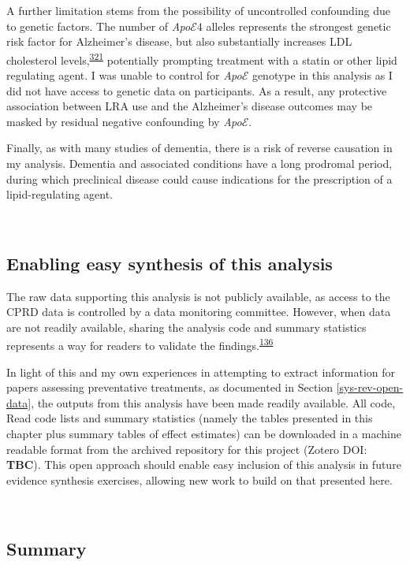 \documentclass[a4paper, twoside]{templates/ociamthesis}
\begin{document}
A further limitation stems from the possibility of uncontrolled confounding due to genetic factors. The number of \emph{Apo}\(\mathcal{E}4\) alleles represents the strongest genetic risk factor for Alzheimer's disease, but also substantially increases LDL cholesterol levels,\textsuperscript{\protect\hyperlink{ref-bennet2007}{321}} potentially prompting treatment with a statin or other lipid regulating agent. I was unable to control for \emph{Apo}\(\mathcal{E}\) genotype in this analysis as I did not have access to genetic data on participants. As a result, any protective association between LRA use and the Alzheimer's disease outcomes may be masked by residual negative confounding by \emph{Apo}\(\mathcal{E}\).

Finally, as with many studies of dementia, there is a risk of reverse causation in my analysis. Dementia and associated conditions have a long prodromal period, during which preclinical disease could cause indications for the prescription of a lipid-regulating agent.

~

\hypertarget{cprd-data-avail}{%
\subsection{Enabling easy synthesis of this analysis}\label{cprd-data-avail}}

The raw data supporting this analysis is not publicly available, as access to the CPRD data is controlled by a data monitoring committee. However, when data are not readily available, sharing the analysis code and summary statistics represents a way for readers to validate the findings.\textsuperscript{\protect\hyperlink{ref-goldacre2019}{136}}

In light of this and my own experiences in attempting to extract information for papers assessing preventative treatments, as documented in Section \ref{sys-rev-open-data}, the outputs from this analysis have been made readily available. All code, Read code lists and summary statistics (namely the tables presented in this chapter plus summary tables of effect estimates) can be downloaded in a machine readable format from the archived repository for this project (Zotero DOI: \textbf{TBC}). This open approach should enable easy inclusion of this analysis in future evidence synthesis exercises, allowing new work to build on that presented here.

~

\hypertarget{summary-4}{%
\subsection{Summary}\label{summary-4}}
\end{document}
